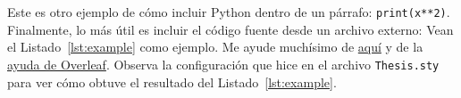 Este es otro ejemplo de cómo incluir Python dentro de un párrafo: \texttt{print(x**2)}.
Finalmente, lo más útil es incluir el código fuente desde un archivo externo: Vean  el Listado~\ref{lst:example} como ejemplo.
Me ayude muchísimo de \href{https://tex.stackexchange.com/questions/252263/alignment-of-minted-line-numbers}{aquí} y de la \href{https://www.overleaf.com/learn/latex/Code_Highlighting_with_minted}{ayuda de Overleaf}.
Observa la configuración que hice en el archivo \verb|Thesis.sty| para ver cómo obtuve el resultado del Listado~\ref{lst:example}.


